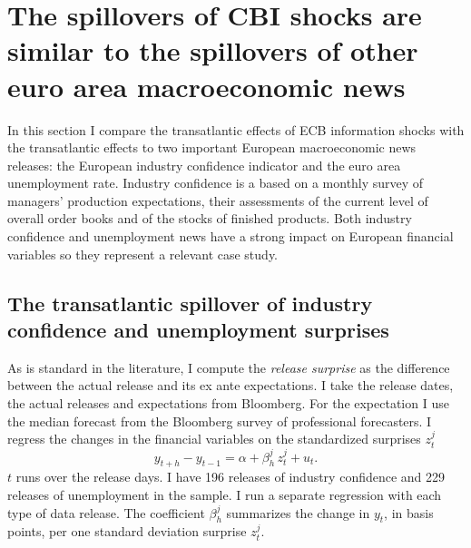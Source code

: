 \documentclass[a4paper,12pt]{article}
\begin{document}
\section{The spillovers of CBI shocks are similar to the spillovers of other euro area macroeconomic news}

In this section I compare the transatlantic effects of ECB information shocks with the
transatlantic effects to two important European macroeconomic news releases: 
the European industry confidence indicator and the euro area unemployment rate.
Industry confidence is a based on a monthly survey of managers’
production expectations, their assessments of the current level of overall order books and of the
stocks of finished products.
Both industry confidence and unemployment news have a strong impact on European financial variables
so they represent a relevant case study.

\subsection{The transatlantic spillover of industry confidence and unemployment surprises}

As is standard in the literature, I compute the \emph{release surprise} as the difference between the actual release
and its ex ante expectations. 
I take the release dates, the actual releases and expectations from Bloomberg.
For the expectation I use the median forecast from the Bloomberg survey of professional forecasters.
I regress the changes in the financial variables on the standardized surprises $z_t^j$
\begin{equation}
y^{}_{t+h}-y^{}_{t-1} = \alpha + \beta_h^j\, z_t^j + u_t.
\end{equation}
$t$ runs over the release days. I have 196 releases of industry confidence and 229 releases of unemployment in the sample. I run a separate regression with each type of data release.
The coefficient $\beta_h^j$ summarizes the change in $y_t$, in basis points, per one
standard deviation surprise $z_t^j$.
\end{document}
